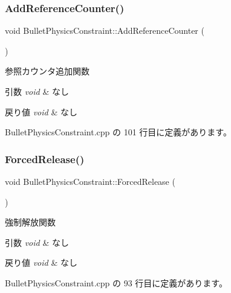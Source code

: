 \subsubsection{\texorpdfstring{Add\+Reference\+Counter()}{AddReferenceCounter()}}
{\footnotesize\ttfamily void Bullet\+Physics\+Constraint\+::\+Add\+Reference\+Counter (\begin{DoxyParamCaption}{ }\end{DoxyParamCaption})}



参照カウンタ追加関数 


\begin{DoxyParams}{引数}
{\em void} & なし \\
\hline
\end{DoxyParams}

\begin{DoxyRetVals}{戻り値}
{\em void} & なし \\
\hline
\end{DoxyRetVals}


 Bullet\+Physics\+Constraint.\+cpp の 101 行目に定義があります。

\mbox{\label{class_bullet_physics_constraint_ad5fa02063f2b563bd01f37a2e8896554}} 
\subsubsection{\texorpdfstring{Forced\+Release()}{ForcedRelease()}}
{\footnotesize\ttfamily void Bullet\+Physics\+Constraint\+::\+Forced\+Release (\begin{DoxyParamCaption}{ }\end{DoxyParamCaption})}



強制解放関数 


\begin{DoxyParams}{引数}
{\em void} & なし \\
\hline
\end{DoxyParams}

\begin{DoxyRetVals}{戻り値}
{\em void} & なし \\
\hline
\end{DoxyRetVals}


 Bullet\+Physics\+Constraint.\+cpp の 93 行目に定義があります。

